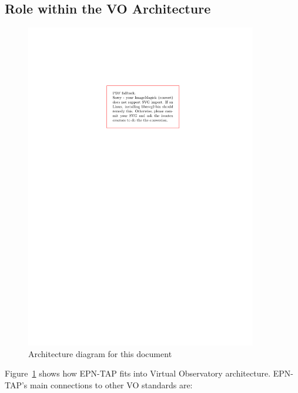 \documentclass[11pt,a4paper]{ivoa}
\begin{document}
\subsection{Role within the VO Architecture}

\begin{figure}[thb]
\centering

\includegraphics[width=0.9\textwidth]{role_diagram.pdf}
\caption{Architecture diagram for this document}
\label{fig:archdiag}
\end{figure}


Figure~\ref{fig:archdiag} shows how EPN-TAP fits into Virtual
Observatory architecture.  EPN-TAP's main connections to other VO
standards are:
\end{document}
